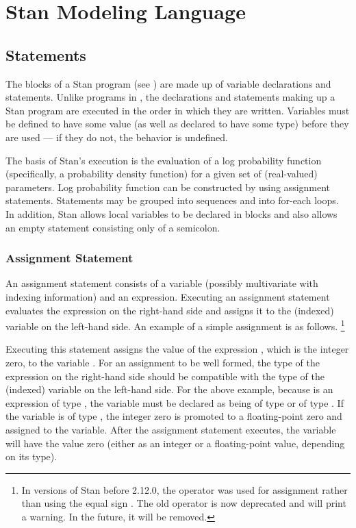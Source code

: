 \part{Stan Modeling Language}


\chapter{Statements}

\noindent
The blocks of a Stan program (see ) are made up of
variable declarations and statements.  Unlike programs in \BUGS, the
declarations and statements making up a Stan program are executed in
the order in which they are written.  Variables must be defined to
have some value (as well as declared to have some type) before they
are used --- if they do not, the behavior is undefined.

The basis of Stan's execution is the evaluation of a log probability
function (specifically, a probability density function) for a given
set of (real-valued) parameters. Log probability function can be
constructed by using assignment statements.  Statements may be grouped
into sequences and into for-each loops.  In addition, Stan allows
local variables to be declared in blocks and also allows an empty
statement consisting only of a semicolon.


\section{Assignment Statement}\label{assignment-statement.section}

An assignment statement consists of a variable (possibly multivariate
with indexing information) and an expression.  Executing an
assignment statement evaluates the expression on the right-hand side
and assigns it to the (indexed) variable on the left-hand side.  An
example of a simple assignment is as follows.%
%
\footnote{In versions of Stan before 2.12.0, the operator \code{<-} was
  used for assignment rather than using the equal sign \code{=}.  The
  old operator \code{<-} is now deprecated and will print a warning.
  In the future, it will be removed.}
%
\begin{quote}
\end{quote}
%
Executing this statement assigns the value of the expression ,
which is the integer zero, to the variable .  For an assignment
to be well formed, the type of the expression on the right-hand side
should be compatible with the type of the (indexed) variable on the
left-hand side.  For the above example, because  is an
expression of type , the variable  must be declared
as being of type  or of type .  If the variable
is of type , the integer zero is promoted to a
floating-point zero and assigned to the variable.  After the
assignment statement executes, the variable  will have the
value zero (either as an integer or a floating-point value, depending on
its type).


